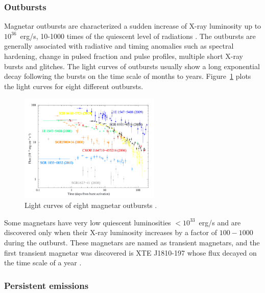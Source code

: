 \subsubsection{Outbursts}

Magnetar outbursts are characterized a sudden increase of X-ray luminosity up to $10^{36}$~erg/s, 10-1000 times of the quiescent level of radiations \citep{2004ApJ...609L..21I,2004ApJ...605..368G,2008A&ARv..15..225M,2011ASSP...21..247R}.
The outbursts are generally associated with radiative and timing anomalies such as spectral hardening, change in pulsed fraction and pulse profiles, multiple short X-ray bursts and glitches.
The light curves of outbursts usually show a long exponential decay following the bursts on the time scale of months to years. 
Figure~\ref{fig:outburst-light-curve} plots the light curves for eight different outbursts.
%
\begin{figure}[h]
  \centering
  \includegraphics[width=0.6\textwidth]{pics/intro/outbursts.png}
  \caption[Light curves of eight magnetar outbursts]{Light curves of eight magnetar outbursts \citep{2011ASSP...21..247R}.}
  \label{fig:outburst-light-curve}
\end{figure}
%

Some magnetars have very low quiescent luminosities $<10^{33}$~erg/s and are discovered only when their X-ray luminosity increases by a factor of $100-1000$ during the outburst.
These magnetars are named as transient magnetars, and the first transient magnetar was discovered is XTE J1810-197 \citep{2004ApJ...609L..21I} whose flux decayed on the time scale of a year \citep{2007Ap&SS.308...79G}.

\subsubsection{Persistent emissions}


